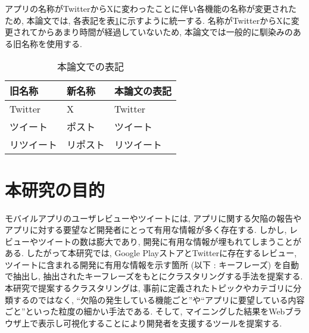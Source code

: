 アプリの名称がTwitterからXに変わったことに伴い各機能の名称が変更されたため, 本論文では, 各表記を表\ref{tb:twitter}に示すように統一する. 名称がTwitterからXに変更されてからあまり時間が経過していないため, 本論文では一般的に馴染みのある旧名称を使用する. 

\begin{table}[H]
  \caption{本論文での表記}
  \label{tb:twitter}
  \begin{center}
  \begin{tabularx}{\linewidth}{X|X|X}
    \hline
    旧名称&新名称&本論文の表記\\\hline\hline
    Twitter&X&Twitter\\\hline
    ツイート&ポスト&ツイート\\\hline
    リツイート&リポスト&リツイート\\\hline
  \end{tabularx}\end{center}
\end{table}


\section{本研究の目的}

モバイルアプリのユーザレビューやツイートには, アプリに関する欠陥の報告やアプリに対する要望など開発者にとって有用な情報が多く存在する. しかし, レビューやツイートの数は膨大であり, 開発に有用な情報が埋もれてしまうことがある. 
したがって本研究では, Google PlayストアとTwitterに存在するレビュー, ツイートに含まれる開発に有用な情報を示す箇所 (以下 : キーフレーズ) を自動で抽出し, 抽出されたキーフレーズをもとにクラスタリングする手法を提案する. 本研究で提案するクラスタリングは, 事前に定義されたトピックやカテゴリに分類するのではなく, ``欠陥の発生している機能ごと''や``アプリに要望している内容ごと''といった粒度の細かい手法である. 
そして, マイニングした結果をWebブラウザ上で表示し可視化することにより開発者を支援するツールを提案する. 


